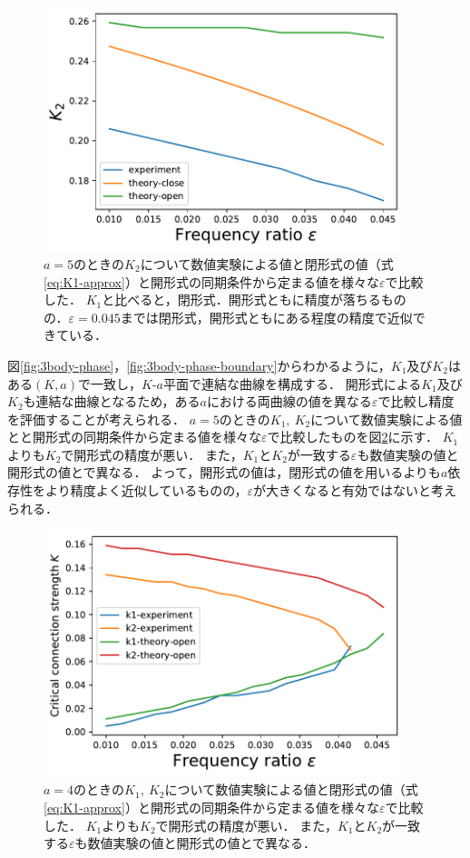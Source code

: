 \documentclass[../main]{subfiles}
\begin{document}
\begin{figure}[tbp]
\centering
\includegraphics[width=105mm]{./images/k2-compare.pdf}
\centering
\caption{$a=5$のときの$K_2$について数値実験による値と閉形式の値（式\eqref{eq:K1-approx}）と開形式の同期条件から定まる値を様々な$\varepsilon$で比較した．
$K_1$と比べると，閉形式．開形式ともに精度が落ちるものの．$\varepsilon=0.045$までは閉形式，開形式ともにある程度の精度で近似できている．}
\label{fig:k2-compare}
\end{figure}

図\ref{fig:3body-phase}，\ref{fig:3body-phase-boundary}からわかるように，$K_1$及び$K_2$はある$(K,a)$で一致し，$K$-$a$平面で連結な曲線を構成する．
開形式による$K_1$及び$K_2$も連結な曲線となるため，ある$a$における両曲線の値を異なる$\varepsilon$で比較し精度を評価することが考えられる．
$a=5$のときの$K_1,\ K_2$について数値実験による値とと開形式の同期条件から定まる値を様々な$\varepsilon$で比較したものを図\ref{fig:k1k2-compare}に示す．
$K_1$よりも$K_2$で開形式の精度が悪い．
また，$K_1$と$K_2$が一致する$\varepsilon$も数値実験の値と開形式の値とで異なる．
よって，開形式の値は，閉形式の値を用いるよりも$a$依存性をより精度よく近似しているものの，$\varepsilon$が大きくなると有効ではないと考えられる．

\begin{figure}[tbp]
\centering
\includegraphics[width=105mm]{./images/k1k2-compare-open.pdf}
\centering
\caption{$a=4$のときの$K_1,\ K_2$について数値実験による値と閉形式の値（式\eqref{eq:K1-approx}）と開形式の同期条件から定まる値を様々な$\varepsilon$で比較した．
$K_1$よりも$K_2$で開形式の精度が悪い．
また，$K_1$と$K_2$が一致する$\varepsilon$も数値実験の値と開形式の値とで異なる．}
\label{fig:k1k2-compare}
\end{figure}
\end{document}
